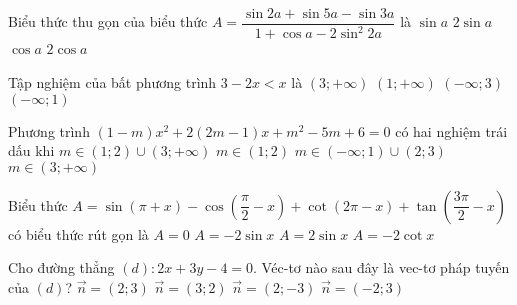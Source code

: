 	\begin{ex}%
		Biểu thức thu gọn của biểu thức $A = \dfrac{\sin 2a +\sin 5a - \sin 3a}{1 + \cos a - 2\sin^2 2a}$ là
		\choice
		{$\sin a$} 
		{\True $2\sin a$}
		{$\cos a$}
		{$2 \cos a$}
	\end{ex}
	
	\begin{ex}%
		Tập nghiệm của bất phương trình $3-2x<x$ là
		\choice
		{$(3;+\infty)$} 
		{\True $(1;+\infty)$}
		{$(-\infty; 3)$}
		{$(-\infty;1)$}
	\end{ex}
	
	\begin{ex}%
		Phương trình $(1-m)x^2 + 2(2m-1)x + m^2-5m+6=0$ có hai nghiệm trái dấu khi
		\choice
		{$m\in (1;2) \cup (3;+\infty)$} 
		{$m\in (1;2)$}
		{\True $m\in (-\infty; 1) \cup (2;3)$}
		{$m\in (3;+\infty)$}
	\end{ex}
	
	\begin{ex}%
		Biểu thức $A = \sin(\pi + x) - \cos \left( \dfrac{\pi}{2} - x \right) + \cot (2\pi - x) + \tan \left( \dfrac{3\pi}{2} - x \right)$ có biểu thức rút gọn là
		\choice
		{$A=0$} 
		{\True $A = - 2 \sin x$}
		{$A = 2\sin x$}
		{$A = - 2 \cot x$}
	\end{ex}
	
	\begin{ex}%
		Cho đường thẳng $(d): 2x+ 3y - 4 = 0$. Véc-tơ nào sau đây là vec-tơ pháp tuyến của $(d)$?
		\choice
		{\True $\overrightarrow{n} = (2;3)$} 
		{$\overrightarrow{n} = (3;2)$}
		{$\overrightarrow{n} = (2;-3)$}
		{$\overrightarrow{n} = (-2;3)$}
	\end{ex}
	

